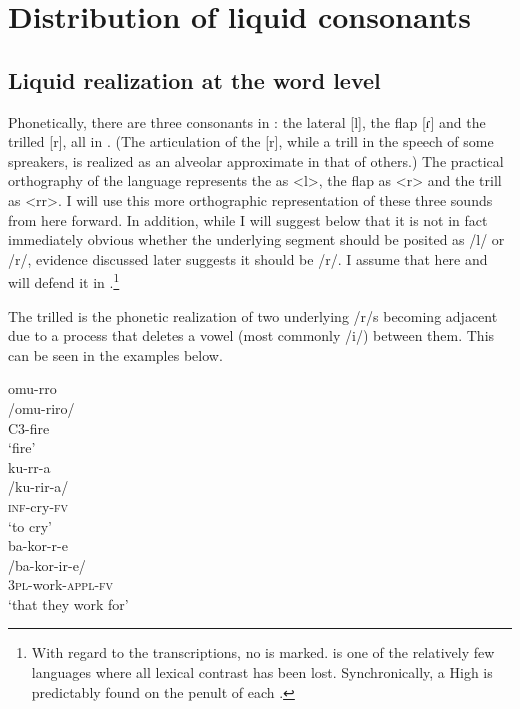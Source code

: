 \documentclass[output=paper
,newtxmath
,modfonts
,nonflat]{langsci/langscibook}
\begin{document}
\section{Distribution of liquid consonants}
\subsection{Liquid realization at the word level}

Phonetically, there are three  consonants in : the lateral [l], the flap [ɾ] and the trilled [r], all in . (The articulation of the [r], while a trill in the speech of some  spreakers, is realized as an alveolar approximate in that of others.) The practical orthography of the language represents the  as <l>, the flap as <r> and the trill as <rr>. I will use this more orthographic representation of these three sounds from here forward. In addition, while I will suggest below that it is not in fact immediately obvious whether the underlying segment should be posited as /l/ or /r/, evidence discussed later suggests it should be /r/. I assume that here and will defend it in .\footnote{With regard to the  transcriptions, no  is marked.  is one of the relatively few  languages where all lexical  contrast has been lost. Synchronically, a High is predictably found on the penult of each .}%
%

The trilled  is the phonetic realization of two underlying /r/s becoming adjacent due to a process that deletes a vowel (most commonly /i/) between them. This can be seen in the examples below.

\ea\label{ex:bickmore:1}
\ea\label{ex:bickmore:1a}
\glll omu-rro \\
/omu-riro/\\
C3-fire\\
\glt ‘fire’\\
\ex\label{ex:bickmore:1b}
\glll ku-rr-a \\
/ku-rir-a/\\
\textsc{inf-}\textup{cry}\textsc{{}-fv}\\
\glt  ‘to cry’\\
\ex\label{ex:bickmore:1c}
\glll ba-kor-r-e \\
/ba-kor-ir-e/\\
\textsc{3pl-}\textup{work}\textsc{{}-appl-fv}\\
\glt  ‘that they work for’\\
\z
\z
%
%
\end{document}
